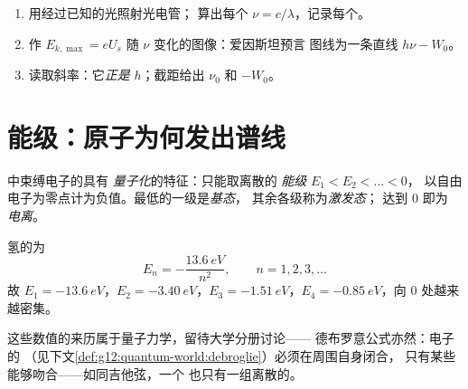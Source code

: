 \begin{method}[测量普朗克常量]\label{met:g12:quantum-world:measure-h}
\begin{enumerate}
  \item 用经过已知的光照射光电管；
        算出每个 $\nu = c/\lambda$，记录每个。
  \item 作 $E_{k,\max} = eU_s$ 随 $\nu$ 变化的图像：爱因斯坦预言
        图线为一条直线 $h\nu - W_0$。
  \item 读取斜率：它\emph{正是} $h$；截距给出 $\nu_0$ 和 $-W_0$。
\end{enumerate}
\end{method}

\section{能级：原子为何发出谱线}

\begin{definition}[能级]\label{def:g12:quantum-world:levels}
中束缚电子的具有
\emph{量子化}的特征：只能取离散的
\emph{能级} $E_1 < E_2 < \dots < 0$，
以自由电子为零点计为负值。最低的一级是\emph{基态}，
其余各级称为\emph{激发态}；
达到 $0$ 即为
\emph{电离}。
\end{definition}

\begin{proposition}[氢原子的能级阶梯]\label{prop:g12:quantum-world:hydrogen}
氢的为
\[
E_n = -\frac{\qty{13.6}{eV}}{n^2}, \qquad n = 1, 2, 3, \dots
\]
故 $E_1 = \qty{-13.6}{eV}$，$E_2 = \qty{-3.40}{eV}$，$E_3 =
\qty{-1.51}{eV}$，$E_4 = \qty{-0.85}{eV}$，向 $0$ 处越来越密集。
\end{proposition}
\admitted

\begin{remark}[能级阶梯的来源]\label{rem:g12:quantum-world:ladder-origin}
这些数值的来历属于量子力学，留待大学分册讨论——
德布罗意公式亦然：电子的
（见下文\cref{def:g12:quantum-world:debroglie}）必须在周围自身闭合，
只有某些能够吻合——如同吉他弦，一个
也只有一组离散的。
\end{remark}

